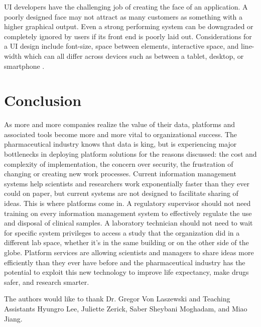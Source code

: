 \documentclass[sigconf]{acmart}
\begin{document}
UI developers have the challenging job of creating the face of an application. A poorly designed face may not attract as many customers as something with a higher graphical output. Even a strong performing system can be downgraded or completely ignored by users if its front end is poorly laid out. Considerations for a UI design include font-size, space between elements, interactive space, and line-width which can all differ across devices such as between a tablet, desktop, or smartphone \cite{Macik}. 

\section{Conclusion}
As more and more companies realize the value of their data, platforms and associated tools become more and more vital to organizational success. The pharmaceutical industry knows that data is king, but is experiencing major bottlenecks in deploying platform solutions for the reasons discussed: the cost and complexity of implementation, the concern over security, the frustration of changing or creating new work processes. Current information management systems help scientists and researchers work exponentially faster than they ever could on paper, but current systems are not designed to facilitate sharing of ideas. This is where platforms come in. A regulatory supervisor should not need training on every information management system to effectively regulate the use and disposal of clinical samples. A laboratory technician should not need to wait for specific system privileges to access a study that the organization did in a different lab space, whether it's in the same building or on the other side of the globe. Platform services are allowing scientists and managers to share ideas more efficiently than they ever have before and the pharmaceutical industry has the potential to exploit this new technology to improve life expectancy, make drugs safer, and research smarter. 

\begin{acks}
The authors would like to thank Dr. Gregor Von Laszewski  and Teaching Assistants Hyungro Lee, Juliette Zerick, Saber Sheybani Moghadam, and Miao Jiang.
\end{acks}


 
\end{document}
